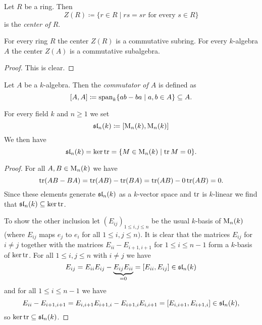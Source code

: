 \begin{defi}
  Let $R$ be a ring. Then
  \[
              Z(R)
    \coloneqq \{
                r \in R
              \mid
                rs = sr
                \text{ for every }
                s \in R
              \}
  \]
  is the \emph{center of $R$}.
\end{defi}


\begin{lem}
  For every ring $R$ the center $Z(R)$ is a commutative subring.
  For every $k$-algebra $A$ the center $Z(A)$ is a commutative subalgebra.
\end{lem}
\begin{proof}
  This is clear.
\end{proof}


\begin{defi}
  Let $A$ be a $k$-algebra.
  Then the \emph{commutator of $A$} is defined as
  \[
              [A,A]
    \coloneqq \operatorname{span}_k  \{
                          ab - ba
                        \mid
                          a, b \in A
                        \}
    \subseteq A.
  \]
\end{defi}


\begin{expl}
  For every field $k$ and $n \geq 1$ we set
  \[
    \operatorname{\mathfrak{sl}}_n(k) \coloneqq [\operatorname{M}_n(k), \operatorname{M}_n(k)]
  \]
  We then have
  \[
      \operatorname{\mathfrak{sl}}_n(k)
    = \ker \operatorname{tr}
    = \{
        M \in \operatorname{M}_n(k)
      \mid
        \operatorname{tr} M = 0
      \}.
  \]
  \begin{proof}
    For all $A, B \in \operatorname{M}_n(k)$ we have
    \[
        \operatorname{tr}(AB - BA)
      = \operatorname{tr}(AB) - \operatorname{tr}(BA)
      = \operatorname{tr}(AB) -0\operatorname{tr}(AB)
      = 0.
    \]
    Since these elements generate $\operatorname{\mathfrak{sl}}_n(k)$ as a $k$-vector space and $\operatorname{tr}$ is $k$-linear we find that $\operatorname{\mathfrak{sl}}_n(k) \subseteq \ker \operatorname{tr}$.
    
    To show the other inclusion let $(E_{ij})_{1 \leq i,j \leq n}$ be the usual $k$-basis of $\operatorname{M}_n(k)$ (where $E_{ij}$ maps $e_j$ to $e_i$ for all $1 \leq i,j \leq n)$.
    It is clear that the matrices $E_{ij}$ for $i \neq j$ together with the matrices $E_{ii}-E_{i+1,i+1}$ for $1 \leq i \leq n-1$ form a $k$-basis of $\ker \operatorname{tr}$.
    For all $1 \leq i,j \leq n$ with $i \neq j$ we have
    \[
          E_{ij}
      =   E_{ii} E_{ij} - \underbrace{E_{ij} E_{ii}}_{=0}
      =   [E_{ii}, E_{ij}]
      \in \operatorname{\mathfrak{sl}}_n(k)
    \]
    and for all $1 \leq i \leq n-1$ we have
    \[
          E_{ii} - E_{i+1,i+1}
      =   E_{i,i+1} E_{i+1,i} - E_{i+1,i} E_{i,i+1}
      =   [E_{i,i+1}, E_{i+1,i}]
      \in \operatorname{\mathfrak{sl}}_n(k),
    \]
    so $\ker \operatorname{tr} \subseteq \operatorname{\mathfrak{sl}}_n(k)$.
  \end{proof}
\end{expl}


